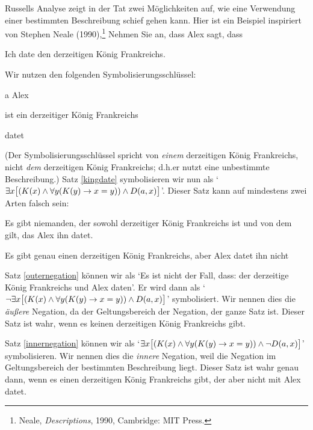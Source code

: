 Russells Analyse zeigt in der Tat zwei Möglichkeiten auf, wie eine Verwendung einer bestimmten Beschreibung schief gehen kann. Hier ist ein Beispiel inspiriert von Stephen Neale (1990),\footnote{Neale, \emph{Descriptions}, 1990, Cambridge: MIT Press.} Nehmen Sie an, dass Alex sagt, dass
	\begin{earg}
		\item[\ex{kingdate}] Ich date den derzeitigen König Frankreichs.
	\end{earg}
Wir nutzen den folgenden Symbolisierungsschlüssel:
	\begin{ekey}
		\item[a] Alex
		\item[\atom{K}{x}]  ist ein derzeitiger König Frankreichs
		\item[\atom{D}{x,y}]  datet 
	\end{ekey}
(Der Symbolisierungsschlüssel spricht von \emph{einem} derzeitigen König Frankreichs, nicht \emph{dem} derzeitigen König Frankreichs; d.h.\@ er nutzt eine unbestimmte Beschreibung.) Satz \ref{kingdate} symbolisieren wir nun als `$\exists x \bigl[(\mathord{K}(x) \wedge \forall y(\mathord{K}(y) \rightarrow  x = y)) \wedge \mathord{D}(a,x)\bigr]$'. Dieser Satz kann auf mindestens zwei Arten falsch sein:
	\begin{earg}
		\item[\ex{outernegation}] Es gibt niemanden, der sowohl derzeitiger König Frankreichs ist und von dem gilt, das Alex ihn datet.
		\item[\ex{innernegation}] Es gibt genau einen derzeitigen König Frankreichs, aber Alex datet ihn nicht
	\end{earg}
Satz \ref{outernegation} können wir als `Es ist nicht der Fall, dass: der derzeitige König Frankreichs und Alex daten'. Er wird dann als `$\neg \exists x\bigl[(\mathord{K}(x) \wedge \forall y(\mathord{K}(y) \rightarrow  x = y)) \wedge \mathord{D}(a,x) \bigr]$' symbolisiert. Wir nennen dies die \emph{äu{\ss}ere} Negation, da der Geltungsbereich der Negation, der ganze Satz ist. Dieser Satz ist wahr, wenn es keinen derzeitigen König Frankreichs gibt.

Satz \ref{innernegation} können wir als `$\exists x \bigl[(\mathord{K}(x) \wedge \forall y(\mathord{K}(y) \rightarrow x = y)) \wedge \neg \mathord{D}(a,x)\bigr]$' symbolisieren. Wir nennen dies die \emph{innere} Negation, weil die Negation im Geltungsbereich der bestimmten Beschreibung liegt. Dieser Satz ist wahr genau dann, wenn es einen derzeitigen König Frankreichs gibt, der aber nicht mit Alex datet.

